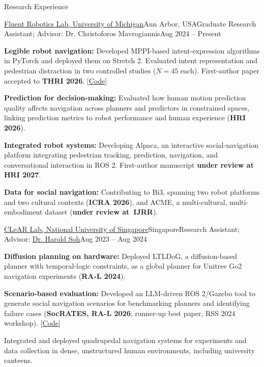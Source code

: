 \documentclass{resume}
\begin{document}
\begin{rSection}{Research Experience}
\begin{rSubsection}{\href{https://fluentrobotics.com}{Fluent Robotics Lab, University of Michigan}}{Ann Arbor, USA}{Graduate Research Assistant; Advisor: Dr. Christoforos Mavrogiannis}{Aug 2024 -- Present}
\item {\bf Legible robot navigation:} Developed MPPI-based intent-expression algorithms in PyTorch and deployed them on Stretch 2. Evaluated intent representation and pedestrian distraction in two controlled studies ($N=45$ each). First-author paper accepted to {\bf THRI 2026}. [\href{https://github.com/fluentrobotics/Legible_MPPI}{Code}]
\item {\bf Prediction for decision-making:} Evaluated how human motion prediction quality affects navigation across planners and predictors in constrained spaces, linking prediction metrics to robot performance and human experience ({\bf HRI 2026}).
\item {\bf Integrated robot systems:} Developing Alpaca, an interactive social-navigation platform integrating pedestrian tracking, prediction, navigation, and conversational interaction in ROS 2. First-author manuscript {\bf under review at HRI 2027}.
\item {\bf Data for social navigation:} Contributing to Bi3, spanning two robot platforms and two cultural contexts ({\bf ICRA 2026}), and ACME, a multi-cultural, multi-embodiment dataset ({\bf under review at~IJRR}).
\end{rSubsection}

\begin{rSubsection}{\href{https://clear-nus.github.io}{CLeAR Lab, National University of Singapore}}{Singapore}{Research Assistant; Advisor: \href{https://haroldsoh.com}{Dr. Harold Soh}}{Aug 2023 -- Aug 2024}
\item {\bf Diffusion planning on hardware:} Deployed LTLDoG, a diffusion-based planner with temporal-logic constraints, as a global planner for Unitree Go2 navigation experiments ({\bf RA-L 2024}).
\item {\bf Scenario-based evaluation:} Developed an LLM-driven ROS 2/Gazebo tool to generate social navigation scenarios for benchmarking planners and identifying failure cases ({\bf SocRATES, RA-L 2026}; runner-up best paper, RSS 2024 workshop). [\href{https://github.com/clear-nus/SocRATES}{Code}]
\item Integrated and deployed quadrupedal navigation systems for experiments and data collection in dense, unstructured human environments, including university canteens.
\end{rSubsection}



\end{rSection}
\end{document}
